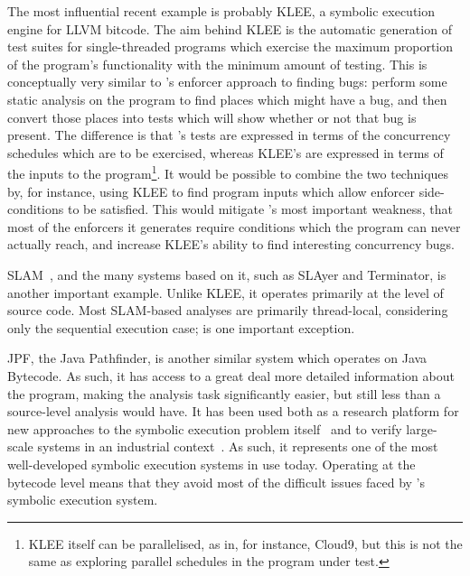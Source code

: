 The most influential recent example is probably KLEE\cite{Cadar}, a
symbolic execution engine for LLVM bitcode\cite{Lattner2013}.  The aim
behind KLEE is the automatic generation of test suites for
single-threaded programs which exercise the maximum proportion of the
program's functionality with the minimum amount of testing.  This is
conceptually very similar to {\technique}'s enforcer approach to
finding bugs: perform some static analysis on the program to find
places which might have a bug, and then convert those places into
tests which will show whether or not that bug is present.  The
difference is that {\technique}'s tests are expressed in terms of the
concurrency schedules which are to be exercised, whereas KLEE's are
expressed in terms of the inputs to the program\footnote{KLEE itself
  can be parallelised, as in, for instance, Cloud9\cite{Ciortea2010},
  but this is not the same as exploring parallel schedules in the
  program under test.}.  It would be possible to combine the two
techniques by, for instance, using KLEE to find program inputs which
allow {\technique} enforcer side-conditions to be satisfied.  This
would mitigate {\technique}'s most important weakness, that most of
the enforcers it generates require conditions which the program can
never actually reach, and increase KLEE's ability to find interesting
concurrency bugs.

SLAM~\cite{Ball2011}, and the many systems based on it, such as
SLAyer\cite{Berdine2011} and Terminator\cite{Cook2006a}, is another
important example.  Unlike KLEE, it operates primarily at the level of
source code.  Most SLAM-based analyses are primarily thread-local,
considering only the sequential execution case; \cite{Cook2007} is one
important exception.  

JPF, the Java Pathfinder\cite{Havelund2000}, is another similar system
which operates on Java Bytecode\cite{Lindholm2013}.  As such, it has
access to a great deal more detailed information about the program,
making the analysis task significantly easier, but still less than a
source-level analysis would have.  It has been used both as a research
platform for new approaches to the symbolic execution problem
itself~\cite{D'Amorim2008,Gligoric2010} and to verify large-scale
systems in an industrial context~\cite{PCZsCZreanu2008}.  As such, it
represents one of the most well-developed symbolic execution systems
in use today.  Operating at the bytecode level means that they avoid
most of the difficult issues faced by {\technique}'s symbolic
execution system.

